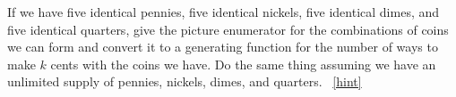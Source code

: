 \documentclass{book}
\begin{document}
\setcounter{project}{316}
\addtocounter{project}{-1}
\begin{activity}[]\label{change-making}
\hypertarget{p-1603}{}%
If we have five identical pennies, five identical nickels, five identical dimes, and five identical quarters, give the picture enumerator for the combinations of coins we can form and convert it to a generating function for the number of ways to make \(k\) cents with the coins we have. Do the same thing assuming we have an unlimited supply of pennies, nickels, dimes, and quarters.%
~\hfill{\tiny\hyperlink{a-316}{[hint]}\hypertarget{q-316}{}}\end{activity}
\end{document}
